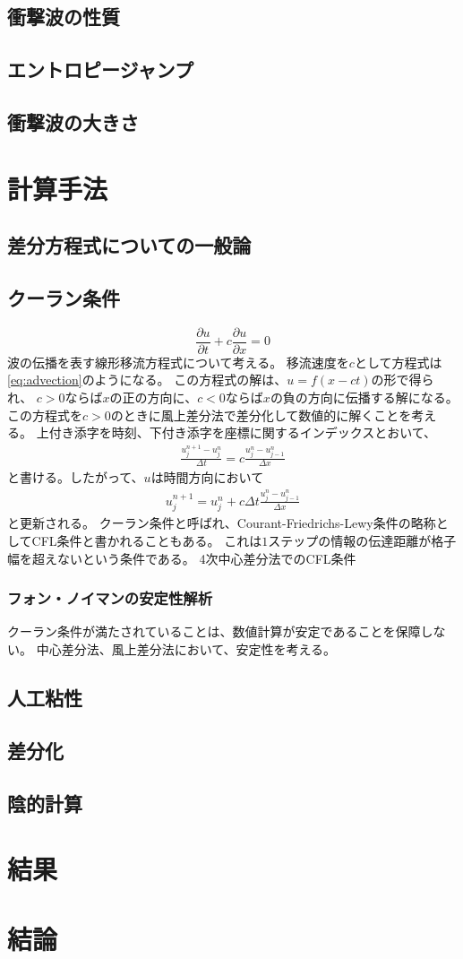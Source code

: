 \documentclass{jsarticle}
\newcommand{\pder}[2][]{\frac{\partial#1}{\partial#2}}
\begin{document}
\subsection{衝撃波の性質}
\subsection{エントロピージャンプ}
\subsection{衝撃波の大きさ}
\section{計算手法}
\subsection{差分方程式についての一般論}
\subsection{クーラン条件}
\begin{equation}
    \pder[u]{t} + c\pder[u]{x} = 0\label{eq:advection}
\end{equation}
波の伝播を表す線形移流方程式について考える。
移流速度を$c$として方程式は\eqref{eq:advection}のようになる。
この方程式の解は、$u = f(x -ct)$の形で得られ、
$c>0$ならば$x$の正の方向に、$c<0$ならば$x$の負の方向に伝播する解になる。
この方程式を$c>0$のときに風上差分法で差分化して数値的に解くことを考える。
上付き添字を時刻、下付き添字を座標に関するインデックスとおいて、
\begin{align}
    \frac{u^{n+1}_j - u^{n}_j}{\Delta t} = c \frac{u^n_{j} - u^n_{j-1}}{\Delta x}
\end{align}
と書ける。したがって、$u$は時間方向において
\begin{align}
    u^{n+1}_j  =  u^{n}_j+ c \Delta t\frac{u^n_{j} - u^n_{j-1}}{\Delta x}
\end{align}
と更新される。
クーラン条件と呼ばれ、Courant-Friedrichs-Lewy条件の略称としてCFL条件と書かれることもある。
これは$1$ステップの情報の伝達距離が格子幅を超えないという条件である。%
4次中心差分法でのCFL条件
\subsubsection{フォン・ノイマンの安定性解析}
クーラン条件が満たされていることは、数値計算が安定であることを保障しない。
中心差分法、風上差分法において、安定性を考える。

\subsection{人工粘性}
\subsection{差分化}
\subsection{陰的計算}
\section{結果}
\section{結論}
\end{document}
